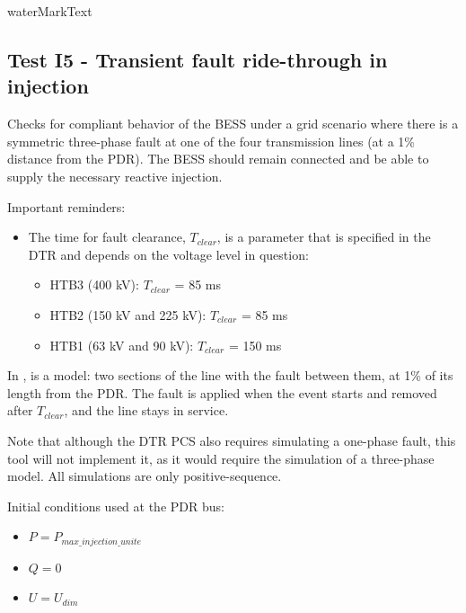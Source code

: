     {{ waterMarkText }}

    \renewcommand{\DTRPcs}{ThreePhaseFault} %
    \renewcommand{\PCSname}{PCS_RTE-I16z3}
    \renewcommand{\OCname}{TransientBoltedInjection}


    \subsection{Test I5 - Transient fault ride-through in injection}

    Checks for compliant behavior of the BESS under a grid scenario where there
    is a symmetric three-phase fault at one of the four transmission lines
    (at a 1\% distance from the PDR). The BESS should remain connected and
    be able to supply the necessary reactive injection.

    \GridCircuitZthree

    \noindent Important reminders:
    \begin{itemize}
        \item The time for fault clearance, $T_{clear}$, is a parameter that
        is specified in the DTR and depends on the voltage level in
        question:
        \begin{itemize}
            \item HTB3 (400 kV): $T_{clear}$ = 85 ms
            \item HTB2 (150 kV and 225 kV): $T_{clear}$ = 85 ms
            \item HTB1 (63 kV and 90 kV): $T_{clear}$ = 150 ms
        \end{itemize}
    \end{itemize}

    In \Dynawo{},  is a  model: two sections of the
    line with the fault between them, at 1\% of its length from the PDR. The
    fault is applied when the event starts and removed after $T_{clear}$, and the
    line stays in service.

    Note that although the DTR PCS also requires simulating a one-phase
    fault, this tool will not implement it, as it would require the
    simulation of a three-phase model. All simulations are only
    positive-sequence.

    \begin{description}
        \item Initial conditions used at the PDR bus:
        \begin{itemize}
            \item $P = P_{max\_injection\_unite}$
            \item $Q = 0$
            \item $U = U_{dim}$
        \end{itemize}
    \end{description}

